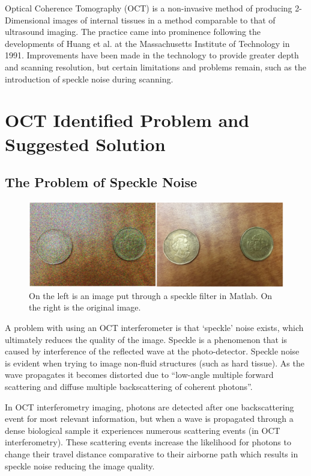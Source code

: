 \documentclass[%
reprint,
showpacs,preprintnumbers,
bibnotes,
amsmath,amssymb,
aps,
pra,
]{revtex4-1}
\begin{document}
		Optical Coherence Tomography (OCT) is a non-invasive method of producing 2-Dimensional images of internal tissues in a method comparable to that of ultrasound imaging.\cite{Huang91}\cite{sander_optical_2011} The practice came into prominence following the developments of Huang et al. at the Massachusetts Institute of Technology in 1991. \cite{Huang91} Improvements have been made in the technology to provide greater depth and scanning resolution, but certain limitations and problems remain, such as the introduction of speckle noise during scanning.




	\section{\label{sec:level1}OCT Identified Problem and Suggested Solution}
	\subsection{\label{sec:level2} The Problem of Speckle Noise}
	\begin{figure}
		\centering
		\includegraphics[width=0.8\linewidth]{Figures/specklefilter2}
		\caption{On the left is an image put through a speckle filter in Matlab. On the right is the original image.}
		\label{fig:specklefilter2}
	\end{figure}
		A problem with using an OCT interferometer is that ‘speckle’ noise exists, which ultimately reduces the quality of the image. Speckle is a phenomenon that is caused by interference of the reflected wave at the photo-detector. Speckle noise is evident when trying to image non-fluid structures (such as hard tissue). As the wave propagates it becomes distorted due to “low-angle multiple forward scattering and diffuse multiple backscattering of coherent photons”. \cite{Popescu2007}
	
		In OCT interferometry imaging, photons are detected after one backscattering event for most relevant information, but when a wave is propagated through a dense biological sample it experiences numerous scattering events (in OCT interferometry). These scattering events increase the likelihood for photons to change their travel distance comparative to their airborne path which results in speckle noise reducing the image quality. \cite{Popescu2007}
	
\end{document}
